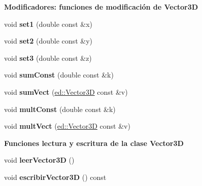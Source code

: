 \begin{Indent}\textbf{ Modificadores\+: funciones de modificación de Vector3D}\par
\begin{DoxyCompactItemize}
\item 
\mbox{\label{classed_1_1Vector3D_acfdf541551fe60c3d01f4415989f20c2}} 
void {\bfseries set1} (double const \&x)
\item 
\mbox{\label{classed_1_1Vector3D_a9148554ef7b54d5f06f1938791ff9e6a}} 
void {\bfseries set2} (double const \&y)
\item 
\mbox{\label{classed_1_1Vector3D_a6c658249a001608a6e8c8e8e249d3fb3}} 
void {\bfseries set3} (double const \&z)
\item 
\mbox{\label{classed_1_1Vector3D_a38a5c63c2926e9685d040eab39e23c60}} 
void {\bfseries sum\+Const} (double const \&k)
\item 
\mbox{\label{classed_1_1Vector3D_a1b33db7851b02ee4a00aee17262af20a}} 
void {\bfseries sum\+Vect} (\mbox{\hyperlink{classed_1_1Vector3D}{ed\+::\+Vector3D}} const \&v)
\item 
\mbox{\label{classed_1_1Vector3D_a02b35a0d961ae10123be25aa6d62f554}} 
void {\bfseries mult\+Const} (double const \&k)
\item 
\mbox{\label{classed_1_1Vector3D_aea173ccbe7eb56fae15e6c64c693f9f4}} 
void {\bfseries mult\+Vect} (\mbox{\hyperlink{classed_1_1Vector3D}{ed\+::\+Vector3D}} const \&v)
\end{DoxyCompactItemize}
\end{Indent}
\begin{Indent}\textbf{ Funciones lectura y escritura de la clase Vector3D}\par
\begin{DoxyCompactItemize}
\item 
\mbox{\label{classed_1_1Vector3D_a383b32d61696badf77dac30aca5211a3}} 
void {\bfseries leer\+Vector3D} ()
\item 
\mbox{\label{classed_1_1Vector3D_a8aa810ccaca06f0f0a34871433e7235b}} 
void {\bfseries escribir\+Vector3D} () const
\end{DoxyCompactItemize}
\end{Indent}
